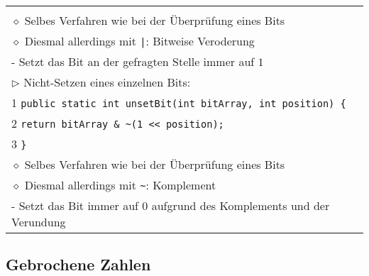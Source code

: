 \begin{longtable}{ | p{} p{} | }
{	\hspace{0.4cm} 3 \hspace{0.1cm} \texttt{\}} \\
	\hspace{0.4cm} $\diamond$ Selbes Verfahren wie bei der Überprüfung eines Bits \\
	\hspace{0.4cm} $\diamond$ Diesmal allerdings mit \texttt{|}: Bitweise Veroderung \\
	\hspace{0.6cm} - Setzt das Bit an der gefragten Stelle immer auf $1$ \\
	$\rhd$ Nicht-Setzen eines einzelnen Bits: \\
	\hspace{0.4cm} 1 \hspace{0.1cm} \texttt{public static int unsetBit(int bitArray, int position) \{} \\
	\hspace{0.4cm} 2 \hspace{0.5cm} \texttt{return bitArray \& \textasciitilde (1 << position);} \\
	\hspace{0.4cm} 3 \hspace{0.1cm} \texttt{\}} \\
	\hspace{0.4cm} $\diamond$ Selbes Verfahren wie bei der Überprüfung eines Bits \\
	\hspace{0.4cm} $\diamond$ Diesmal allerdings mit \texttt{\textasciitilde}: Komplement \\
	\hspace{0.6cm} - Setzt das Bit immer auf $0$ aufgrund des Komplements und der Verundung} \\ \hline

	\end{longtable}



\subsection*{Gebrochene Zahlen}

